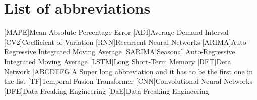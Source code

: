 \documentclass[a4paper,12pt,tikz]{scrreprt}
\begin{document}
\pagestyle{empty}






\makeatletter
\let\partbackup\l@part
\renewcommand*\l@part[2]{\partbackup{#1}{}}

%




\cleardoubleoddpage

\pagestyle{fancy}

\tableofcontents

\listoffigures



\listoftables
\newpage
{}

\pagestyle{fancy}





\chapter*{List of abbreviations}

\begin{acronym}[cv2]
[MAPE]{Mean Absolute Percentage Error}
[ADI]{Average Demand Interval}
[CV2]{Coefficient of Variation}
[RNN]{Recurrent Neural Networks}
[ARIMA]{Auto-Regressive Integrated Moving Average}
[SARIMA]{Seasonal Auto-Regressive Integrated Moving Average}
[LSTM]{Long Short-Term Memory}
[DET]{Deta Network}
[ABCDEFG]{A Super long abbreviation and it has to be the first one in the list}
[TF]{Temporal Fusion Transformer}
[CNN]{Convolutional Neural Networks}
[DFE]{Data Freaking Engineering}
[DaE]{Data Freaking Engineering}
\end{acronym}






%

%

%

%

%

\newpage




\end{document}
